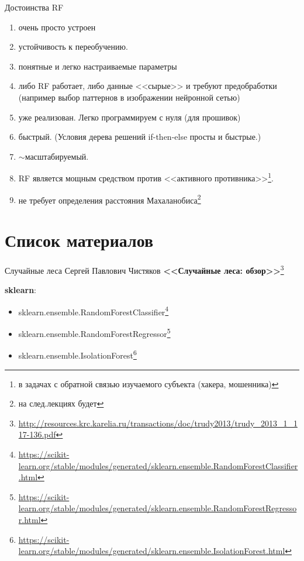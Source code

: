 \documentclass{beamer}
\begin{document}
\begin{frame}{Достоинства RF}
	\footnotesize
	\begin{enumerate}
		\item очень просто устроен
		\item устойчивость к переобучению. 
		\item понятные и легко настраиваемые параметры
		\item либо RF работает, либо данные <<сырые>> и требуют предобработки (например выбор паттернов в изображении нейронной сетью)
		\item уже реализован. Легко программируем с нуля (для прошивок)
		\item быстрый. (Условия дерева решений if-then-else просты и быстрые.)
		\item $\sim$масштабируемый.
		\item RF является мощным средством против <<активного противника>>\footnote{
			в задачах с обратной связью изучаемого субъекта (хакера, мошенника)
		}. 
		\item не требует определения расстояния Махаланобиса\footnote{на след.лекциях будет}
	\end{enumerate}
\end{frame}

\section{Список материалов}

\begin{frame}{Случайные леса}
	Сергей Павлович Чистяков \textbf{<<Случайные леса: обзор>>}\footnote{\tiny
	\url{http://resources.krc.karelia.ru/transactions/doc/trudy2013/trudy_2013_1_117-136.pdf}
	}
	
	\textbf{sklearn}:
	\begin{itemize}
	\item sklearn.ensemble.RandomForestClassifier\footnote{
	\tiny \url{https://scikit-learn.org/stable/modules/generated/sklearn.ensemble.RandomForestClassifier.html}
	}
	\item sklearn.ensemble.RandomForestRegressor\footnote{
	\tiny
	\url{https://scikit-learn.org/stable/modules/generated/sklearn.ensemble.RandomForestRegressor.html}
	}
	\item sklearn.ensemble.IsolationForest\footnote{
	\tiny
	\url{https://scikit-learn.org/stable/modules/generated/sklearn.ensemble.IsolationForest.html}
	}
	\end{itemize}
\end{frame}
\end{document}
